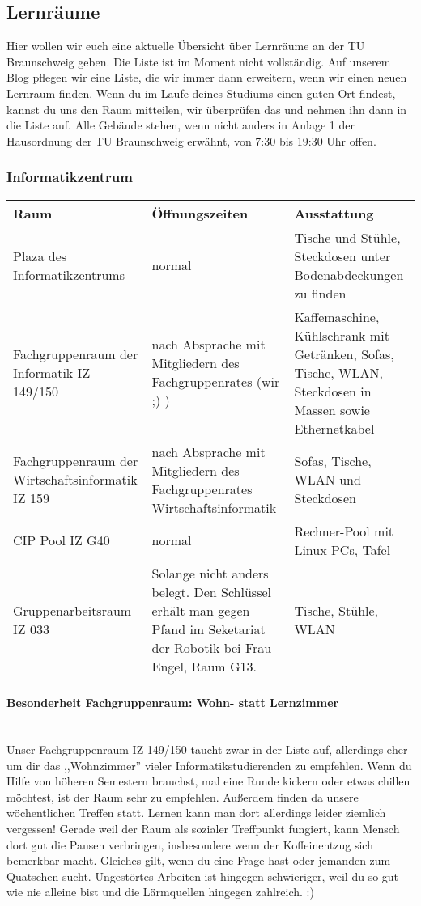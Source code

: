 \subsection{Lernräume}
	Hier wollen wir euch eine aktuelle Übersicht über Lernräume an der TU Braunschweig geben. Die Liste ist im Moment nicht vollständig. Auf unserem Blog pflegen wir eine Liste, die wir immer dann erweitern, wenn wir einen neuen Lernraum finden.
Wenn du im Laufe deines Studiums einen guten Ort findest, kannst du uns den Raum mitteilen, wir überprüfen das und nehmen ihn dann in die Liste auf. Alle Gebäude stehen, wenn nicht anders in Anlage 1 der Hausordnung der TU Braunschweig erwähnt, von 7:30 bis 19:30 Uhr offen.
	\subsubsection*{Informatikzentrum}
		\begin{tabular}{|p{4cm}|p{5cm}|p{8cm}|}
			\hline Raum & Öffnungszeiten & Ausstattung \\ 
			\hline Plaza des Informatikzentrums & normal &  Tische und Stühle, Steckdosen unter Bodenabdeckungen zu finden \\
			\hline Fachgruppenraum der Informatik IZ 149/150 &
			nach Absprache mit Mitgliedern des
			Fachgruppenrates (wir ;) ) & Kaffemaschine,
			Kühlschrank mit Getränken, 
			Sofas, Tische, WLAN, Steckdosen in Massen sowie Ethernetkabel\\ 
			\hline Fachgruppenraum der Wirtschaftsinformatik
			IZ 159 & nach Absprache mit Mitgliedern des
			Fachgruppenrates Wirtschaftsinformatik & Sofas, Tische, WLAN und Steckdosen \\ 
			\hline CIP Pool IZ G40 & normal & Rechner-Pool mit Linux-PCs, Tafel\\ 
			\hline Gruppenarbeitsraum IZ 033 & 
			
			Solange nicht anders belegt. Den Schlüssel
			erhält man gegen Pfand im Seketariat der Robotik bei Frau Engel,
			Raum G13.
			 &
			Tische, Stühle, WLAN
			\\
			\hline
		\end{tabular}
	\paragraph{Besonderheit Fachgruppenraum: Wohn- statt
	Lernzimmer}\ \\
	Unser Fachgruppenraum IZ 149/150 taucht zwar in der Liste auf,
	allerdings eher um dir das  ,,Wohnzimmer'' vieler
	Informatikstudierenden  zu empfehlen. Wenn du  Hilfe von höheren
	Semestern brauchst, mal eine
	Runde kickern oder etwas chillen möchtest, ist der Raum
	sehr zu empfehlen. Außerdem finden da unsere wöchentlichen
	Treffen statt. Lernen kann man dort allerdings leider ziemlich
	vergessen! Gerade weil der Raum als sozialer Treffpunkt
	fungiert, kann Mensch dort gut die Pausen verbringen,
	insbesondere wenn der Koffeinentzug sich bemerkbar macht.
	Gleiches gilt, wenn du eine Frage hast oder  jemanden zum
	Quatschen sucht. Ungestörtes Arbeiten ist hingegen
	schwieriger, weil du so gut wie nie alleine bist und die
	Lärmquellen hingegen zahlreich. :)
